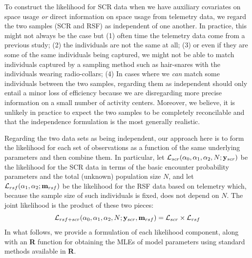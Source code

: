 To construct the likelihood for SCR data when we have auxiliary
covariates on space usage {\it or} direct information on space usage
from telemetry data, we regard the two samples (SCR and RSF) as
independent of one another. In practice, this might not always be the
case but (1) often time the telemetry data come from a previous study;
(2) the individuals are not the same at all; (3) or even if they are
some of the same individuals being captured, we might not be able to
match individuals captured by a sampling method such as hair-snares
with the individuals wearing radio-collars; (4) In cases where we {\it
  can} match some individuals between the two samples, regarding them as
independent should only entail a minor
loss of efficiency
because we are disregarding more precise information on a small number
of activity centers. Moreover, we believe, it is unlikely in practice
to expect the two samples to be completely reconcilable and that the
independence formulation is the most generally realistic.

Regarding the two data sets as being independent, our approach here
is to form the likelihood for each set of observations as a function
of the same underlying parameters and then combine them. In
particular, let ${\cal L}_{scr}(\alpha_{0}, \alpha_{1}, \alpha_{2}, N;
{\bf y}_{scr})$
be the likelihood for the SCR data in terms of the basic encounter
probability parameters and the total (unknown) population size $N$,
and let ${\cal L}_{rsf}(\alpha_{1},\alpha_{2}; {\bf m}_{rsf})$ be the
likelihood for the RSF data based on telemetry which, because the
sample size of such individuals is fixed, does not depend on $N$.
The
joint likelihood is the product of these two pieces:
\[
{\cal L}_{rsf+scr}(\alpha_{0},\alpha_{1},\alpha_{2},N; {\bf y}_{scr},{\bf
  m}_{rsf})  = {\cal L}_{scr} \times {\cal L}_{rsf}
\]
In what follows, we provide a formulation of each likelihood
component, along with an {\bf R} function for obtaining the MLEs of
model parameters using standard methods available in {\bf R}.

